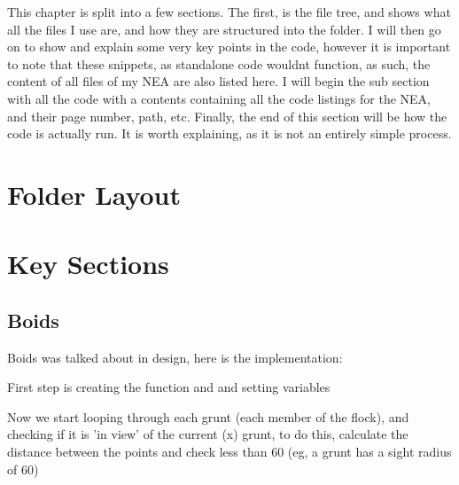 This chapter is split into a few sections. The first, is the file tree, and shows what all the files I use are, and how they are structured into the folder. I will then go on to show and explain some very key points in the code, however it is important to note that these snippets, as standalone code wouldnt function, as such, the content of all files of my NEA are also listed here. I will begin the sub section with all the code with a contents containing all the code listings for the NEA, and their page number, path, etc. Finally, the end of this section will be how the code is actually run. It is worth explaining, as it is not an entirely simple process.

\section{Folder Layout}

\section{Key Sections}
\subsection{Boids}
Boids was talked about in design, here is the implementation:

First step is creating the function and and setting variables


Now we start looping through each grunt (each member of the flock), and checking if it is 'in view' of the current (x) grunt, to do this, calculate the distance between the points and check less than 60 (eg, a grunt has a sight radius of 60) 


